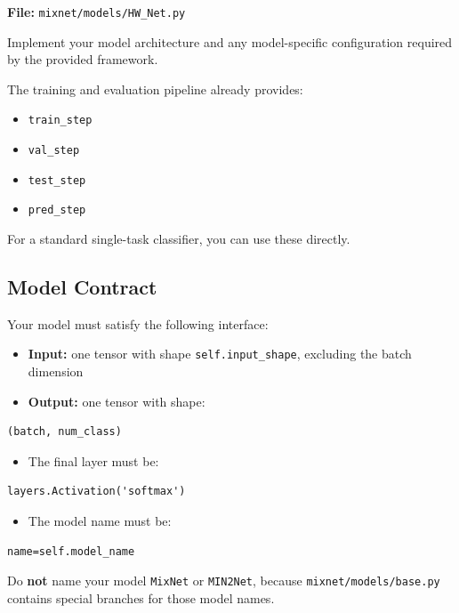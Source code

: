 \documentclass[
  10pt,
]{article}
\begin{document}
\textbf{File:} \texttt{mixnet/models/HW\_Net.py}

Implement your model architecture and any model-specific configuration
required by the provided framework.

The training and evaluation pipeline already provides:

\begin{itemize}
\item
  \texttt{train\_step}
\item
  \texttt{val\_step}
\item
  \texttt{test\_step}
\item
  \texttt{pred\_step}
\end{itemize}

For a standard single-task classifier, you can use these directly.

\subsection{Model Contract}\label{model-contract}

Your model must satisfy the following interface:

\begin{itemize}
\item
  \textbf{Input:} one tensor with shape \texttt{self.input\_shape},
  excluding the batch dimension
\item
  \textbf{Output:} one tensor with shape:
\end{itemize}

\begin{verbatim}
(batch, num_class)
\end{verbatim}

\begin{itemize}
\item
  The final layer must be:
\end{itemize}

\begin{verbatim}
layers.Activation('softmax')
\end{verbatim}

\begin{itemize}
\item
  The model name must be:
\end{itemize}

\begin{verbatim}
name=self.model_name
\end{verbatim}

Do \textbf{not} name your model \texttt{MixNet} or \texttt{MIN2Net},
because \texttt{mixnet/models/base.py} contains special branches for
those model names.
\end{document}
